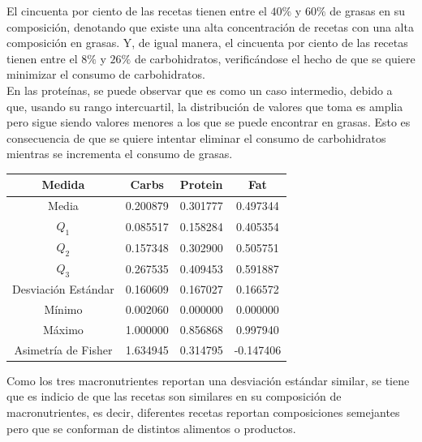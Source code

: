 \documentclass[12pt,a4paper]{article}
\begin{document}
            El cincuenta por ciento de las recetas tienen entre el $40\%$ y 
            $60\%$ de grasas en su composición, denotando que existe una alta 
            concentración de recetas con una alta composición en grasas. Y, de 
            igual manera, el cincuenta por ciento de las recetas tienen entre 
            el $8\%$ y $26\%$ de carbohidratos, verificándose el hecho de que 
            se quiere minimizar el consumo de carbohidratos.\\

            En las proteínas, se puede observar que es como un caso intermedio, 
            debido a que, usando su rango intercuartil, la distribución de valores 
            que toma es amplia pero sigue siendo valores menores a los que se puede 
            encontrar en grasas. Esto es consecuencia de que se quiere intentar 
            eliminar el consumo de carbohidratos mientras se incrementa el consumo 
            de grasas.

            \begin{center}
                \begin{tabular}{| c | c c c |}
                    \toprule
                    Medida & Carbs & Protein & Fat \\
                    \midrule
                    Media               & 0.200879 & 0.301777 & 0.497344  \\
                    $Q_1$               & 0.085517 & 0.158284 & 0.405354  \\
                    $Q_2$               & 0.157348 & 0.302900 & 0.505751  \\
                    $Q_3$               & 0.267535 & 0.409453 & 0.591887  \\
                    Desviación Estándar & 0.160609 & 0.167027 & 0.166572  \\
                    Mínimo              & 0.002060 & 0.000000 & 0.000000  \\
                    Máximo              & 1.000000 & 0.856868 & 0.997940  \\
                    Asimetría de Fisher & 1.634945 & 0.314795 & -0.147406 \\
                    \bottomrule
                \end{tabular}
            \end{center}

            Como los tres macronutrientes reportan una desviación estándar similar, 
            se tiene que es indicio de que las recetas son similares en su composición 
            de macronutrientes, es decir, diferentes recetas reportan composiciones 
            semejantes pero que se conforman de distintos alimentos o productos.\\
\end{document}
